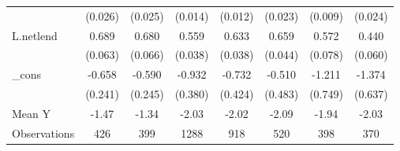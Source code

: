 {\begin{tabular}{l*{7}{c}}
            &     (0.026)         &     (0.025)         &     (0.014)         &     (0.012)         &     (0.023)         &     (0.009)         &     (0.024)         \\
\addlinespace
L.netlend   &       0.689\sym{***}&       0.680\sym{***}&       0.559\sym{***}&       0.633\sym{***}&       0.659\sym{***}&       0.572\sym{***}&       0.440\sym{***}\\
            &     (0.063)         &     (0.066)         &     (0.038)         &     (0.038)         &     (0.044)         &     (0.078)         &     (0.060)         \\
\addlinespace
\_cons      &      -0.658\sym{**} &      -0.590\sym{**} &      -0.932\sym{**} &      -0.732\sym{*}  &      -0.510         &      -1.211         &      -1.374\sym{**} \\
            &     (0.241)         &     (0.245)         &     (0.380)         &     (0.424)         &     (0.483)         &     (0.749)         &     (0.637)         \\
\midrule
Mean Y      &       -1.47         &       -1.34         &       -2.03         &       -2.02         &       -2.09         &       -1.94         &       -2.03         \\
Observations&         426         &         399         &        1288         &         918         &         520         &         398         &         370         \\
\bottomrule
\end{tabular}
}
